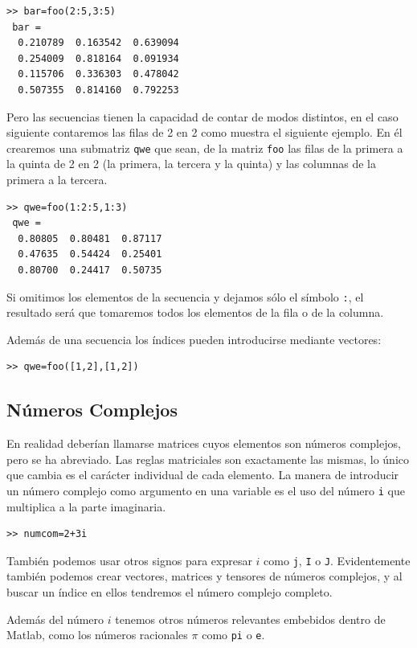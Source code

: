\begin{lstlisting}
>> bar=foo(2:5,3:5)
 bar =
  0.210789  0.163542  0.639094
  0.254009  0.818164  0.091934
  0.115706  0.336303  0.478042
  0.507355  0.814160  0.792253
\end{lstlisting}
Pero las secuencias tienen la capacidad de contar de modos distintos,
en el caso siguiente contaremos las filas de 2 en 2 como muestra el
siguiente ejemplo. En él crearemos una submatriz \texttt{qwe} que
sean, de la matriz \texttt{foo} las filas de la primera a la quinta de
2 en 2 (la primera, la tercera y la quinta) y las columnas de la
primera a la tercera.

\begin{lstlisting}
>> qwe=foo(1:2:5,1:3)
 qwe =
  0.80805  0.80481  0.87117
  0.47635  0.54424  0.25401
  0.80700  0.24417  0.50735
\end{lstlisting}
Si omitimos los elementos de la secuencia y dejamos sólo el símbolo
\texttt{:}, el resultado será que tomaremos todos los elementos de la
fila o de la columna.

Además de una secuencia los índices pueden introducirse mediante
vectores:

\begin{lstlisting}
>> qwe=foo([1,2],[1,2])
\end{lstlisting}

\subsection{Números Complejos }

En realidad deberían llamarse matrices cuyos elementos son números
complejos, pero se ha abreviado. Las reglas matriciales son
exactamente las mismas, lo único que cambia es el carácter individual
de cada elemento. La manera de introducir un número complejo como
argumento en una variable es el uso del número \texttt{i} que
multiplica a la parte imaginaria.

\begin{lstlisting}
>> numcom=2+3i
\end{lstlisting}

También podemos usar otros signos para expresar \texttt{$i$} como
\texttt{j}, \texttt{I} o \texttt{J}. Evidentemente también podemos
crear vectores, matrices y tensores de números complejos, y al buscar
un índice en ellos tendremos el número complejo completo.

Además del número \texttt{$i$} tenemos otros números relevantes
embebidos dentro de Matlab, como los números racionales $\pi$ como
\texttt{pi} o \texttt{e}.


